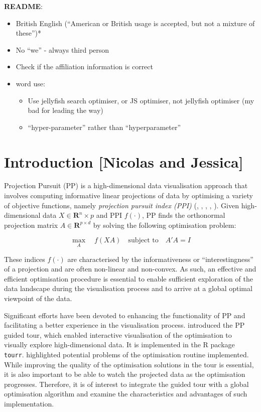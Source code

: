 \documentclass[
  number,
  preprint,
  3p]{elsarticle}
\providecommand{\tightlist}{%
  \setlength{\itemsep}{0pt}\setlength{\parskip}{0pt}}\usepackage{longtable,booktabs,array}
\begin{document}
\textbf{README}:

\begin{itemize}
\item
  British English (``American or British usage is accepted, but not a
  mixture of these'')*
\item
  No ``we'' - always third person
\item
  Check if the affiliation information is correct
\item
  word use:

  \begin{itemize}
  \tightlist
  \item
    Use jellyfish search optimiser, or JS optimiser, not jellyfish
    optimiser (my bad for leading the way)
  \item
    ``hyper-parameter'' rather than ``hyperparameter''
  \end{itemize}
\end{itemize}

\hypertarget{introduction-nicolas-and-jessica}{%
\section{Introduction {[}Nicolas and
Jessica{]}}\label{introduction-nicolas-and-jessica}}

Projection Pursuit (PP) is a high-dimensional data visualisation
approach that involves computing informative linear projections of data
by optimising a variety of objective functions, namely \emph{projection
pursuit index (PPI)} (\citet{hall1989polynomial},
\citet{cook1993projection}, \citet{lee2010projection},
\citet{Loperfido2018}, \citet{Loperfido2020}). Given high-dimensional
data \(X \in \mathbf{R}^{n }\times p\) and PPI \(f(\cdot)\), PP finds
the orthonormal projection matrix \(A \in \mathbf{R}^{p \times d}\) by
solving the following optimisation problem:

\[
\underset{A}{\max } \quad f(XA) \quad \text{subject to} \quad A'A = I
\]

These indices \(f(\cdot)\) are characterised by the informativeness or
``interestingness'' of a projection and are often non-linear and
non-convex. As such, an effective and efficient optimisation procedure
is essential to enable sufficient exploration of the data landscape
during the visualisation process and to arrive at a global optimal
viewpoint of the data.

Significant efforts have been devoted to enhancing the functionality of
PP and facilitating a better experience in the visualisation process.
\citet{cook1995grand} introduced the PP guided tour, which enabled
interactive visualisation of the optimisation to visually explore
high-dimensional data. It is implemented in the R \citep{R} package
\texttt{tourr}\citep{tourr}. \citet{RJ-2021-105} highlighted potential
problems of the optimisation routine implemented. While improving the
quality of the optimisation solutions in the tour is essential, it is
also important to be able to watch the projected data as the
optimisation progresses. Therefore, it is of interest to integrate the
guided tour with a global optimisation algorithm and examine the
characteristics and advantages of such implementation.
\end{document}

